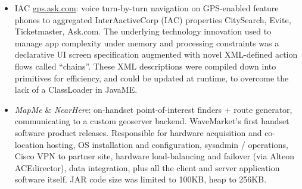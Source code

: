 \begin{itemize}
  		\item IAC \url{gps.ask.com}: voice turn-by-turn navigation on GPS-enabled feature phones
		 to aggregated InterAactiveCorp (IAC) properties CitySearch, Evite, Ticketmaster, Ask.com. The underlying technology innovation
		  used to manage app complexity under memory and processing constraints was a declarative UI screen specification
		   augmented with novel XML-defined action flows called “chains”. These XML descriptions were compiled down
		    into primitives for efficiency, and could be updated at runtime, to overcome the lack of a ClassLoader 
		    in JavaME. 
	   
  		\item {\em MapMe} \& {\em NearHere}:
		on-handset point-of-interest finders + route generator, communicating to a custom geoserver
		backend. WaveMarket’s first handset software product releases. Responsible for hardware acquisition
		and co-location hosting,
		OS installation and configuration, sysadmin / operations, Cisco VPN to partner site, hardware load-balancing
		and failover (via Alteon ACEdirector), data integration, plus all the client and server application software itself.
		JAR code size was limited to 100KB, heap to 256KB.
		
	\end{itemize}


